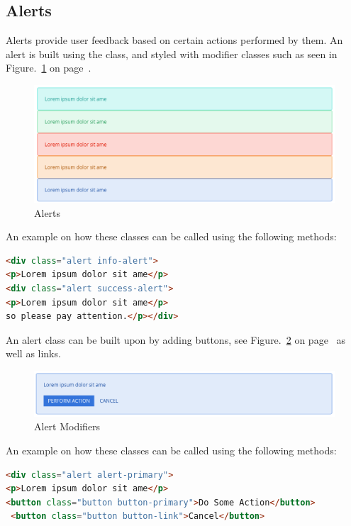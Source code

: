 \newpage
\subsection*{Alerts}
Alerts provide user feedback based on certain actions performed by them. An alert is built using the  class, and styled with modifier classes such as seen in Figure.~\ref{fig:alerts} on  page~\pageref{fig:alerts}. 

\begin{figure}[h]
\centering
\includegraphics[scale=0.2]{images/alertd}
\caption{Alerts}
  \label{fig:alerts}
\end{figure}

An example on how these classes can be called using the following methods: 

\begin{lstlisting}[language=HTML]
<div class="alert info-alert">
<p>Lorem ipsum dolor sit ame</p>
<div class="alert success-alert">
<p>Lorem ipsum dolor sit ame</p>
so please pay attention.</p></div>
\end{lstlisting}

An alert class can be built upon by adding buttons, see Figure.~\ref{fig:AlertModifiers} on  page~\pageref{fig:AlertModifiers} as well as links.

\begin{figure}[h]
\centering
\includegraphics[scale=0.2]{images/addtoalert}
\caption{Alert Modifiers}
  \label{fig:AlertModifiers}
\end{figure}

An example on how these classes can be called using the following methods: 

\begin{lstlisting}[language=HTML]
<div class="alert alert-primary">
<p>Lorem ipsum dolor sit ame</p>
<button class="button button-primary">Do Some Action</button>
 <button class="button button-link">Cancel</button>
\end{lstlisting}

